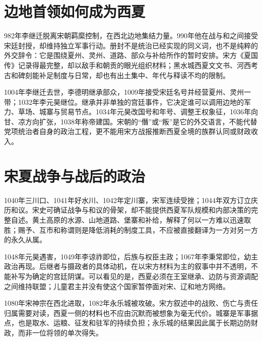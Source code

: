 \section{边地首领如何成为西夏}

982年李继迁脱离宋朝羁縻控制，在西北边地集结力量。990年他在战与和之间接受宋廷封授，却维持独立军事行动。册封不是统治已经实现的同义词，也不是纯粹的外交辞令：它是围绕夏州、灵州、道路、部众与补给所作的暂时安排。宋方《夏国传》记录得最完整，却以敌手和朝贡的眼光组织材料；黑水城西夏文文书、河西考古和碑刻能补足制度与日常，却也有出土集中、年代与释读不均的限制。

1004年李继迁去世，李德明继承部众，1009年接受宋廷名号并经营夏州、灵州一带；1032年李元昊继位。继承并非单独的宫廷事件，它决定谁可以调用边地的军力、草场、城寨与贸易节点。1034年元昊改国号和年号、调整王权象征，1036年向甘、凉方向扩张，1038年称帝建国。宋朝的“僭”或“叛”是它的外交语言，不能代替党项统治者自身的政治工程，更不能用宋方战报推断西夏全境的族群认同或财政收入。

\section{宋夏战争与战后的政治}

1040年三川口、1041年好水川、1042年定川寨，宋军连续受挫；1044年双方订立庆历和议。宋史可确证战争与和议的骨架，却不能提供西夏军队规模和内部决策的完整自述。黄土高原的水源、山地道路、堡寨和补给，解释了何以一方难以迅速取胜；赐予、互市和称谓则是降低消耗的制度工具，不应被直接翻译为一方对另一方的永久从属。

1048年元昊遇害，1049年李谅祚即位，后族与权臣主政；1067年李秉常即位，幼主政治再现。后继者与摄政者的具体动机，在以宋方材料为主的叙事中并不透明，不能补写为确定的宫廷阴谋。可以看见的是，西夏必须在王室继承、边防与资源调配之间维持联盟；儿童君主并没有使这个国家暂停面对宋、辽和地方网络。

1080年宋神宗在西北进取，1082年永乐城被攻破。宋方叙述中的战败、伤亡与责任归属需要对读，西夏一侧的材料也不应由沉默而被想象为毫无代价。城寨是军事据点，也是取水、运粮、征发和驻军的持续负担；永乐城的结果因此属于长期边防财政，而非一位将领的单次得失。

